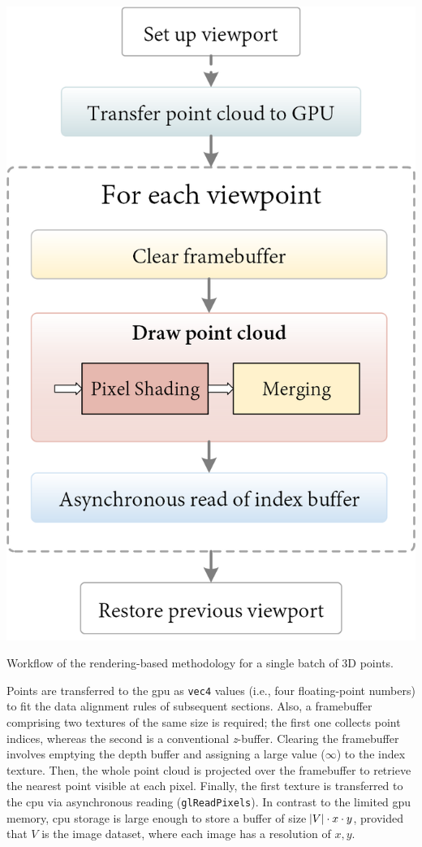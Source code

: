 \begin{marginfigure}[.2cm]
    \centering
    \includegraphics[width=\linewidth]{figs/multi_thermal_projection/occlusion_opengl.png}
    \caption{Workflow of the rendering-based methodology for a single batch of 3D points.}
    \label{fig:occlusion_opengl_zbuffer}
\end{marginfigure}
Points are transferred to the \acrshort{gpu} as \verb|vec4| values (i.e., four floating-point numbers) to fit the data alignment rules of subsequent sections. Also, a framebuffer comprising two textures of the same size is required; the first one collects point indices, whereas the second is a conventional \textit{z}-buffer. Clearing the framebuffer involves emptying the depth buffer and assigning a large value ($\infty$) to the index texture. Then, the whole point cloud is projected over the framebuffer to retrieve the nearest point visible at each pixel. Finally, the first texture is transferred to the \acrshort{cpu} via asynchronous reading (\verb|glReadPixels|). In contrast to the limited \acrshort{gpu} memory, \acrshort{cpu} storage is large enough to store a buffer of size $\abs{V} \cdot x \cdot y$, provided that $V$ is the image dataset, where each image has a resolution of $x, y$.

